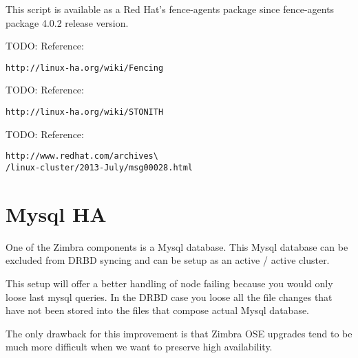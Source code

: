 This script is available as a Red Hat's fence-agents package since fence-agents package 4.0.2 release version.


TODO: Reference: 
\begin{verbatim}
http://linux-ha.org/wiki/Fencing
\end{verbatim}

TODO: Reference:
\begin{verbatim}
http://linux-ha.org/wiki/STONITH
\end{verbatim}

TODO: Reference:
\begin{verbatim}
http://www.redhat.com/archives\
/linux-cluster/2013-July/msg00028.html
\end{verbatim}

\section {Mysql HA}
One of the Zimbra components is a Mysql database. This Mysql database can be excluded from DRBD syncing and can be setup as an active / active cluster.

This setup will offer a better handling of node failing because you would only loose last mysql queries. In the DRBD case you loose all the file changes that have not been stored into the files that compose actual Mysql database.

The only drawback for this improvement is that Zimbra OSE upgrades tend to be much more difficult when we want to preserve high availability.


